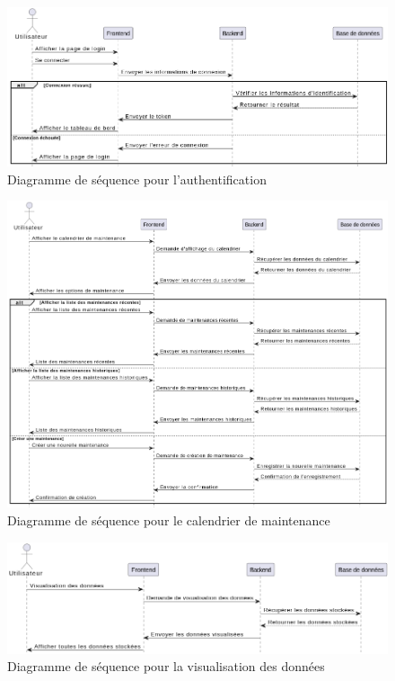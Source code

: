 \begin{figure}[H]
	\centering
	\includegraphics[width=17cm]{./img/composants/diagramme/seq/1-seq-auth.png}
	\caption{Diagramme de séquence pour l'authentification}
\end{figure}


\begin{figure}[H]
	\centering
	\includegraphics[width=16cm]{./img/composants/diagramme/seq/2sequeMaintenance.png}
	\caption{Diagramme de séquence pour le calendrier de maintenance}
\end{figure}
\begin{figure}[H]
	\centering
	\includegraphics[width=17cm]{./img/composants/diagramme/seq/5seqvisualisation.png}
	\caption{Diagramme de séquence pour la visualisation des données}
\end{figure}
